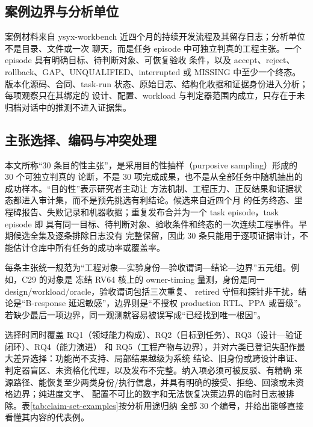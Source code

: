 \documentclass[UTF8,a4paper,zihao=-4,oneside]{ctexart}
\begin{document}
\subsection{案例边界与分析单位}

案例材料来自 ysyx-workbench 近四个月的持续开发流程及其留存日志；分析单位不是目录、文件或一次
聊天，而是任务 episode 中可独立判真的工程主张。一个 episode 具有明确目标、待判断对象、可恢复验收
条件，以及 accept、reject、rollback、GAP、UNQUALIFIED、interrupted 或 MISSING 中至少一个终态。
版本化源码、合同、task-run 状态、原始日志、结构化收据和证据身份进入分析；每项观察只在其绑定的
设计、配置、workload 与判定器范围内成立，只存在于未归档对话中的推测不进入证据集。

\subsection{主张选择、编码与冲突处理}

本文所称“30 条目的性主张”，是采用目的性抽样（purposive sampling）形成的 30 个可独立判真的
论断，不是 30 项完成成果，也不是从全部任务中随机抽出的成功样本。“目的性”表示研究者主动让
方法机制、工程压力、正反结果和证据状态都进入审计集，而不是预先挑选有利结论。候选来自近四个月
的任务终态、里程碑报告、失败记录和机器收据；重复发布合并为一个 task episode，task episode 即
具有同一目标、待判断对象、验收条件和终态的一次连续工程事件。早期候选全集及逐条排除日志没有
完整保留，因此 30 条只能用于逐项证据审计，不能估计仓库中所有任务的成功率或覆盖率。

每条主张统一规范为“工程对象---实验身份---验收谓词---结论---边界”五元组。例如，C29 的对象是
冻结 RV64 核上的 owner-timing 量测，身份是同一 design/workload/oracle，验收谓词包括三次重复、
retired 守恒和探针非干扰，结论是“B-response 延迟敏感”，边界则是“不授权 production RTL、PPA
或晋级”。若缺少最后一项边界，同一观测就容易被误写成“已经找到唯一根因”。

选择时同时覆盖 RQ1（领域能力构成）、RQ2（目标到任务）、RQ3（设计---验证闭环）、RQ4（能力演进）
和 RQ5（工程产物与边界），并对六类已登记失配作最大差异选择：功能尚不支持、局部结果越级为系统
结论、旧身份或跨设计串证、判定器盲区、未资格化代理，以及发布不完整。纳入项必须可被反驳、有精确
来源路径、能恢复至少两类身份/执行信息，并具有明确的接受、拒绝、回滚或未资格边界；纯进度文字、
配置不可比的数字和无法恢复决策边界的临时日志被排除。表\ref{tab:claim-set-examples}按分析用途归纳
全部 30 个编号，并给出能够直接看懂其内容的代表例。
\end{document}
